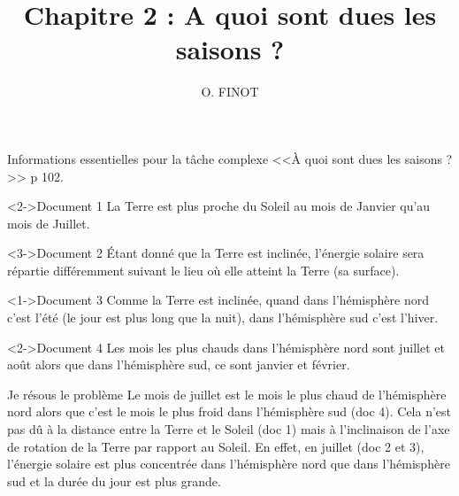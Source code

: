 \documentclass[xcolor={dvipsnames}]{beamer}
\title{Chapitre 2 : A quoi sont dues les saisons ?}
\author{O. FINOT}\institute{Collège S$^t$ Bernard}
\begin{document}
\begin{frame}
  \titlepage 
\end{frame}



\begin{frame}

Informations essentielles pour la tâche complexe <<À quoi sont dues les saisons ?>> p 102. 

 
\begin{block}<2->{Document 1}
	La Terre est plus proche du Soleil au mois de Janvier qu'au mois de Juillet.
\end{block}

\begin{block}<3->{Document 2}
	\'Etant donné que la Terre est inclinée, l'énergie solaire sera répartie différemment suivant le lieu où elle atteint la Terre (sa surface).
\end{block}



\end{frame}


\begin{frame}
	\begin{block}<1->{Document 3}
		Comme la Terre est inclinée, quand dans l’hémisphère nord c’est l’été (le jour est plus long que la nuit), dans l’hémisphère sud c’est l’hiver.
	\end{block}
	
	\begin{block}<2->{Document 4}
		Les mois les plus chauds dans l’hémisphère nord sont juillet et août alors que dans l’hémisphère sud, ce sont janvier et février.
	\end{block}
\end{frame}



\begin{frame}

\begin{block}{Je résous le problème}
	Le mois de juillet est le mois le plus chaud de l’hémisphère nord alors que c’est le mois le plus froid dans l’hémisphère sud (doc 4). Cela n’est pas dû à la distance entre la Terre et le Soleil (doc 1) mais à l’inclinaison de l’axe de rotation de la Terre par rapport au Soleil. En effet, en juillet (doc 2 et 3), l’énergie solaire est plus concentrée dans l’hémisphère nord que dans l’hémisphère sud et la durée du jour est plus grande.
\end{block}

\end{frame}
\end{document}
